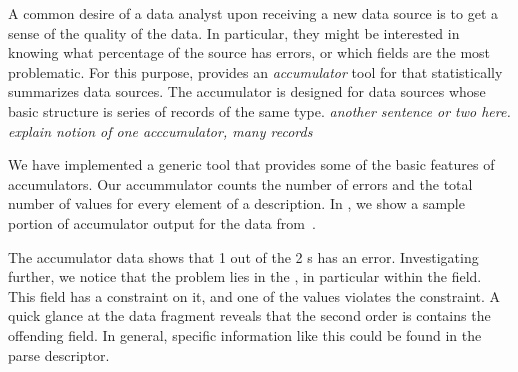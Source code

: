 A common desire of a data analyst upon receiving a new data source is
to get a sense of the quality of the data. In particular, they might
be interested in knowing what percentage of the source has errors, or
which fields are the most problematic. For this purpose, \padsc{}
provides an \emph{accumulator} tool for \padsc{} that statistically
summarizes data sources. The accumulator is designed for data sources
whose basic structure is series of records of the same type.
\emph{another sentence or two here. explain notion of one
  acccumulator, many records}

We have implemented a generic tool that provides some of the basic
features of \padsc{} accumulators. Our accummulator counts the number
of errors and the total number of values for every element of a
description. In , we show a sample
portion of accumulator output for the \dibbler{} data
from~.

The accumulator data shows that 1 out of the 2 s has an
error. Investigating further, we notice that the problem lies in the
, in particular within the  field.
This field has a constraint on it, and one of the values violates the
constraint. A quick glance at the data fragment reveals that the
second order is contains the offending field. In general, specific
information like this could be found in the parse descriptor.

